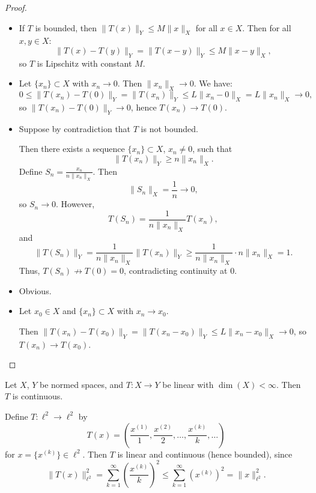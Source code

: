 \begin{proof}
\begin{itemize}[leftmargin=5em]
    \item [$(1) \Rightarrow (2)$]
    If $T$ is bounded, then $\|T(x)\|_Y \leq M \|x\|_X$ for all $x \in X$.  
    Then for all $x, y \in X$:
    \[
    \|T(x) - T(y)\|_Y = \|T(x - y)\|_Y \leq M \|x - y\|_X,
    \]
    so $T$ is Lipschitz with constant $M$.

    \item [$(2) \Rightarrow (3)$]
    Let $\{x_n\} \subset X$ with $x_n \to 0$. Then $\|x_n\|_X \to 0$.  
    We have:
    \[
    0 \leq \|T(x_n) - T(0)\|_Y = \|T(x_n)\|_Y \leq L \|x_n - 0\|_X = L \|x_n\|_X \to 0,
    \]
    so $\|T(x_n) - T(0)\|_Y \to 0$, hence $T(x_n) \to T(0)$.

    \item [$(3) \Rightarrow (1)$]
    Suppose by contradiction that $T$ is not bounded.  
    
    Then there exists a sequence $\{x_n\} \subset X$, $x_n \neq 0$, such that  
    \[
    \|T(x_n)\|_Y \geq n \|x_n\|_X.
    \]
    Define $S_n = \frac{x_n}{n \|x_n\|_X}$. Then  
    \[
    \|S_n\|_X = \frac{1}{n} \to 0,
    \]
    so $S_n \to 0$. However,
    \[
    T(S_n) = \frac{1}{n \|x_n\|_X} T(x_n),
    \]
    and
    \[
    \|T(S_n)\|_Y = \frac{1}{n \|x_n\|_X} \|T(x_n)\|_Y \geq \frac{1}{n \|x_n\|_X} \cdot n \|x_n\|_X = 1.
    \]
    Thus, $T(S_n) \not\to T(0) = 0$, contradicting continuity at $0$.

    \item [$(4) \Rightarrow (3)$]
    Obvious.

    \item [$(3) \Rightarrow (4)$]
    Let $x_0 \in X$ and $\{x_n\} \subset X$ with $x_n \to x_0$.  
    
    Then $\|T(x_n) - T(x_0)\|_Y = \|T(x_n - x_0)\|_Y \leq L \|x_n - x_0\|_X \to 0$,  
    so $T(x_n) \to T(x_0)$.
    
\end{itemize}
\end{proof}

\begin{remark}
Let $X$, $Y$ be normed spaces, and $T: X \to Y$ be linear with $\dim(X) < \infty$.  
Then $T$ is continuous.
\end{remark}

\begin{example}
Define $T: \ell^2 \to \ell^2$ by  
\[
T(x) = \left( \frac{x^{(1)}}{1}, \frac{x^{(2)}}{2}, \dots, \frac{x^{(k)}}{k}, \dots \right)
\]
for $x = \{x^{(k)}\} \in \ell^2$. Then $T$ is linear and continuous (hence bounded), since  
\[
\|T(x)\|_{\ell^2}^2 = \sum_{k=1}^\infty \left( \frac{x^{(k)}}{k} \right)^2 \leq \sum_{k=1}^\infty (x^{(k)})^2 = \|x\|_{\ell^2}^2.
\]
\end{example}

